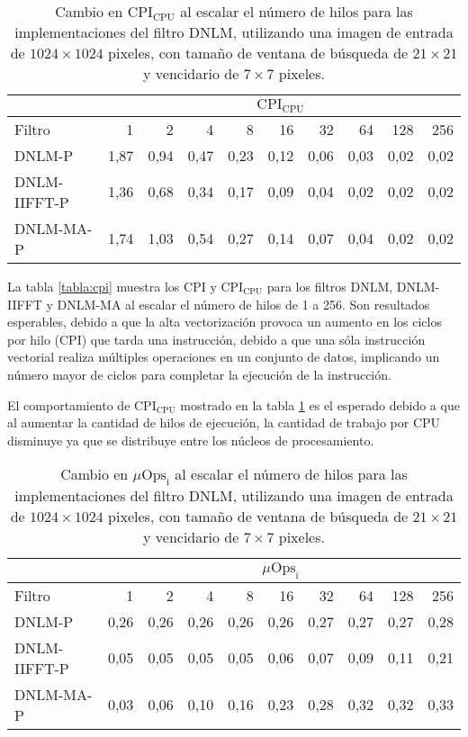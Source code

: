 \begin{table}[htb]
\centering
\caption[Cambio en $\text{CPI}_{\text{CPU}}$ al escalar el n\'umero de hilos]{Cambio en $\text{CPI}_{\text{CPU}}$ al escalar el n\'umero de hilos para las implementaciones del filtro DNLM, utilizando una imagen de entrada de $1024 \times 1024$ pixeles, con tama\~no de ventana de búsqueda de $21 \times 21$ y vencidario de $7 \times 7$ pixeles. \label{tabla:cpic}}
\begin{tabular}{lrrrrrrrrr}
& \multicolumn{9}{c}{$\text{CPI}_{\text{CPU}}$} \tabularnewline
\hline
 Filtro & 1 & 2 & 4 & 8 & 16 & 32 & 64 & 128 & 256 \tabularnewline
\hline
DNLM-P & 1,87 & 0,94 & 0,47 & 0,23 & 0,12 & 0,06 & 0,03 & 0,02 & 0,02 \tabularnewline
DNLM-IIFFT-P & 1,36 & 0,68 & 0,34 & 0,17 & 0,09 & 0,04 & 0,02 & 0,02 & 0,02 \tabularnewline
DNLM-MA-P & 1,74 & 1,03 & 0,54 & 0,27 & 0,14 & 0,07 & 0,04 & 0,02 & 0,02 \tabularnewline
\end{tabular}
\end{table}
  
  
La tabla \ref{tabla:cpi} muestra los CPI y $\text{CPI}_{\text{CPU}}$ para los filtros DNLM, DNLM-IIFFT y DNLM-MA al escalar el n\'umero de hilos de 1 a 256. Son resultados esperables, debido a que la alta vectorizaci\'on provoca un aumento en los ciclos por hilo (CPI) que tarda una instrucci\'on, debido a que una s\'ola instrucci\'on vectorial realiza m\'ultiples operaciones en un conjunto de datos, implicando un n\'umero mayor de ciclos para completar la ejecuci\'on de la instrucci\'on. 

El comportamiento de $\text{CPI}_{\text{CPU}}$ mostrado en la tabla \ref{tabla:cpic}  es el esperado debido a  que al aumentar la cantidad de hilos de ejecuci\'on, la cantidad de trabajo por CPU disminuye ya que se distribuye entre los n\'ucleos de procesamiento. 
  

  
\begin{table}[htb]
\centering
\caption[Cambio en intensidad de  micro-operaciones al escalar el n\'umero de hilos]{Cambio en  $\mu\text{Ops}_{\text{i}}$ al escalar el n\'umero de hilos para las implementaciones del filtro DNLM, utilizando una imagen de entrada de $1024 \times 1024$ pixeles, con tama\~no de ventana de búsqueda de $21 \times 21$ y vencidario de $7 \times 7$ pixeles. \label{tabla:ucode}}
\begin{tabular}{lrrrrrrrrr}
& \multicolumn{9}{c}{$\mu\text{Ops}_{\text{i}}$} \tabularnewline
\hline
 Filtro & 1 & 2 & 4 & 8 & 16 & 32 & 64 & 128 & 256 \tabularnewline
\hline
DNLM-P & 0,26 & 0,26 & 0,26 & 0,26 & 0,26 & 0,27 & 0,27 & 0,27 & 0,28 \tabularnewline
DNLM-IIFFT-P & 0,05 & 0,05 & 0,05 & 0,05 & 0,06 & 0,07 & 0,09 & 0,11 & 0,21 \tabularnewline
DNLM-MA-P & 0,03 & 0,06 & 0,10 & 0,16 & 0,23 & 0,28 & 0,32 & 0,32 & 0,33 \tabularnewline
\end{tabular}
\end{table}

